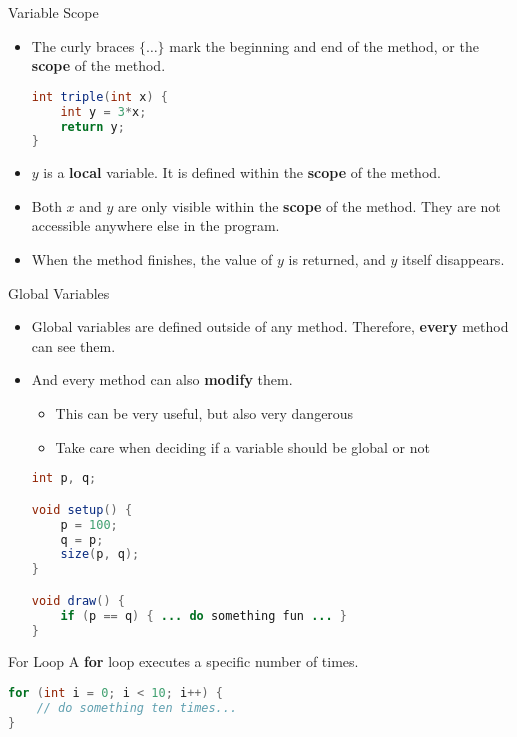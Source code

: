 \documentclass[pdf]{beamer}
\begin{document}
\begin{frame}[fragile]{Variable Scope}
\begin{itemize}
\item The curly braces $\{\ldots\}$ mark the beginning and end of the method, or the \textbf{scope} of the method.
\begin{lstlisting}[language=Java]
int triple(int x) {
    int y = 3*x;
    return y;
}
\end{lstlisting}
\item $y$ is a \textbf{local} variable. It is defined within the \textbf{scope} of the method.
\item Both $x$ and $y$ are only visible within the \textbf{scope} of the method. They are not accessible anywhere else in the program.
\item When the method finishes, the value of $y$ is returned, and $y$ itself disappears.
\end{itemize}
\end{frame}

\begin{frame}[fragile]{Global Variables}
\begin{itemize}
\item Global variables are defined outside of any method. Therefore, \textbf{every} method can see them.
\item And every method can also \textbf{modify} them.
    \begin{itemize}
        \item This can be very useful, but also very dangerous
        \item Take care when deciding if a variable should be global or not
    \end{itemize}
\begin{lstlisting}[language=Java]
int p, q;

void setup() {
    p = 100;
    q = p;
    size(p, q);
}

void draw() {
    if (p == q) { ... do something fun ... }
}

\end{lstlisting}
\end{itemize}
\end{frame}

\begin{frame}[fragile]{For Loop}
A \textbf{for} loop executes a specific number of times.
\begin{lstlisting}[language=Java]
for (int i = 0; i < 10; i++) {
    // do something ten times...
}
\end{lstlisting}
\end{frame}
\end{document}
